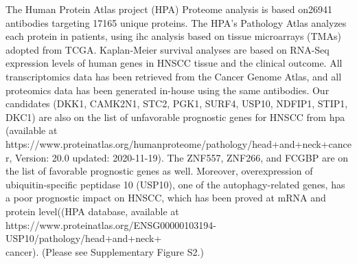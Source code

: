 \documentclass[jpm,article,submit,moreauthors,pdftex]{Definitions/mdpi}
\begin{document}
\begin{paracol}{2}
 
The Human Protein Atlas project (HPA) Proteome analysis is based on26941 antibodies targeting 17165 unique proteins. The HPA's Pathology Atlas analyzes each protein in patients, using \acrshort{ihc} analysis based on tissue microarrays (TMAs) adopted from TCGA. Kaplan-Meier survival analyses are based on RNA-Seq expression levels of human genes in HNSCC tissue and the clinical outcome.
All transcriptomics data has been retrieved from the Cancer Genome Atlas, and all proteomics data has been generated in-house using the same antibodies.
Our candidates (DKK1, CAMK2N1, STC2, PGK1, SURF4, USP10, NDFIP1, STIP1, DKC1) are also on the list of unfavorable prognostic genes for HNSCC from \acrfull{hpa} (available at https://www.proteinatlas.org/humanproteome/pathology/head+and+neck+cancer, Version: 20.0 updated: 2020-11-19). The ZNF557, ZNF266, and FCGBP are on the list of favorable prognostic genes as well.
Moreover, overexpression of ubiquitin-specific peptidase 10 (USP10), one of the autophagy-related genes, has a poor prognostic impact on HNSCC, which has been proved at mRNA and protein level((HPA database, available at https://www.proteinatlas.org/ENSG00000103194-USP10/pathology/head+and+neck+\\cancer)\cite{Ren2020}.
(Please see Supplementary Figure S2.) %





\end{paracol}
\end{document}
